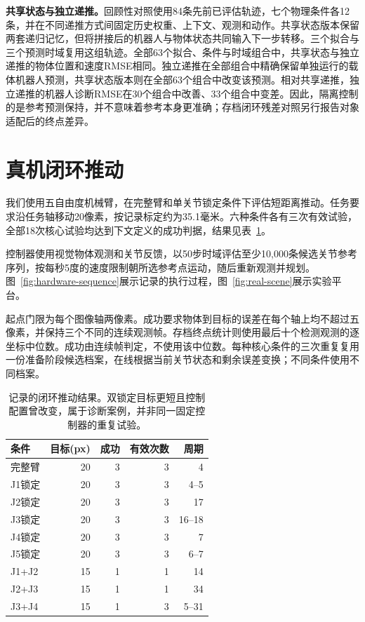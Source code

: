 \documentclass[UTF8,a4paper,10pt,twocolumn]{ctexart}
\begin{document}
\textbf{共享状态与独立递推。}回顾性对照使用84条先前已评估轨迹，七个物理条件各12条，并在不同递推方式间固定历史权重、上下文、观测和动作。共享状态版本保留两套递归记忆，但将拼接后的机器人与物体状态共同输入下一步转移。三个拟合与三个预测时域复用这组轨迹。全部63个拟合、条件与时域组合中，共享状态与独立递推的物体位置和速度RMSE相同。独立递推在全部组合中精确保留单独运行的载体机器人预测，共享状态版本则在全部63个组合中改变该预测。相对共享递推，独立递推的机器人诊断RMSE在30个组合中改善、33个组合中变差。因此，隔离控制的是参考预测保持，并不意味着参考本身更准确；存档闭环残差对照另行报告对象适配后的终点差异。

\section{真机闭环推动}
我们使用五自由度机械臂，在完整臂和单关节锁定条件下评估短距离推动。任务要求沿任务轴移动20像素，按记录标定约为35.1毫米。六种条件各有三次有效试验，全部18次核心试验均达到下文定义的成功判据，结果见表~\ref{tab:real-push}。

控制器使用视觉物体观测和关节反馈，以50步时域评估至少10,000条候选关节参考序列，按每秒5度的速度限制朝所选参考点运动，随后重新观测并规划。图~\ref{fig:hardware-sequence}展示记录的执行过程，图~\ref{fig:real-scene}展示实验平台。

起点门限为每个图像轴两像素。成功要求物体到目标的误差在每个轴上均不超过五像素，并保持三个不同的连续观测帧。存档终点统计则使用最后十个检测观测的逐坐标中位数。成功由连续帧判定，不使用该中位数。每种核心条件的三次重复复用一份准备阶段候选档案，在线根据当前关节状态和剩余误差变换；不同条件使用不同档案。

\begin{table}[t]\centering
\caption{记录的闭环推动结果。双锁定目标更短且控制配置曾改变，属于诊断案例，并非同一固定控制器的重复试验。}
\label{tab:real-push}
\begin{tabular}{lrrrr}\toprule
条件 & 目标(px) & 成功 & 有效次数 & 周期\\\midrule
完整臂 &20&3&3&4\\
J1锁定 &20&3&3&4--5\\
J2锁定 &20&3&3&17\\
J3锁定 &20&3&3&16--18\\
J4锁定 &20&3&3&7\\
J5锁定 &20&3&3&6--7\\\midrule
J1+J2 &15&1&1&14\\
J2+J3 &15&1&1&34\\
J3+J4 &15&1&3&5--31\\\bottomrule
\end{tabular}
\end{table}
\end{document}

